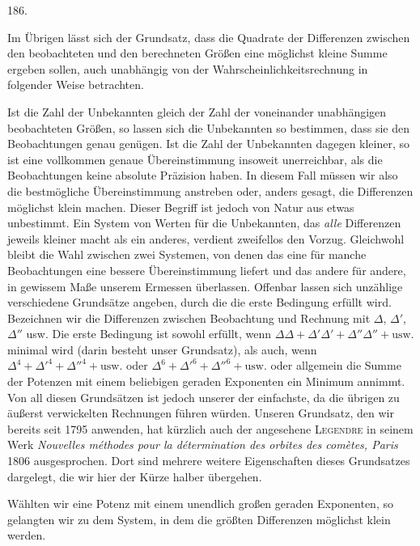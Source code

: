 \begin{center}\hypertarget{native-259-article186}{}186.\end{center}
Im Übrigen lässt sich der Grundsatz, dass die Quadrate der Differenzen zwischen den beobachteten und den berechneten Größen eine möglichst kleine Summe ergeben sollen, auch unabhängig von der Wahrscheinlichkeitsrechnung in folgender Weise betrachten.

Ist die Zahl der Unbekannten gleich der Zahl der voneinander unabhängigen beobachteten Größen, so lassen sich die Unbekannten so bestimmen, dass sie den Beobachtungen genau genügen. Ist die Zahl der Unbekannten dagegen kleiner, so ist eine vollkommen genaue Übereinstimmung insoweit unerreichbar, als die Beobachtungen keine absolute Präzision haben. In diesem Fall müssen wir also die bestmögliche Übereinstimmung anstreben oder, anders gesagt, die Differenzen möglichst klein machen. Dieser Begriff ist jedoch von Natur aus etwas unbestimmt. Ein System von Werten für die Unbekannten, das \emph{alle} Differenzen jeweils kleiner macht als ein anderes, verdient zweifellos den Vorzug. Gleichwohl bleibt die Wahl zwischen zwei Systemen, von denen das eine für manche Beobachtungen eine bessere Übereinstimmung liefert und das andere für andere, in gewissem Maße unserem Ermessen überlassen. Offenbar lassen sich unzählige verschiedene Grundsätze angeben, durch die die erste Bedingung erfüllt wird. Bezeichnen wir die Differenzen zwischen Beobachtung und Rechnung mit $\Delta$, $\Delta'$, $\Delta''$ usw. Die erste Bedingung ist sowohl erfüllt, wenn $\Delta\Delta+\Delta'\Delta'+\Delta''\Delta''+\text{usw.}$ minimal wird (darin besteht unser Grundsatz), als auch, wenn $\Delta^4+\Delta'^4+\Delta''^4+\text{usw.}$ oder $\Delta^6+\Delta'^6+\Delta''^6+\text{usw.}$ oder allgemein die Summe der Potenzen mit einem beliebigen geraden Exponenten ein Minimum annimmt. Von all diesen Grundsätzen ist jedoch unserer der einfachste, da die übrigen zu äußerst verwickelten Rechnungen führen würden. Unseren Grundsatz, den wir bereits seit 1795 anwenden, hat kürzlich auch der angesehene \textsc{Legendre} in seinem Werk \emph{Nouvelles méthodes pour la
détermination des orbites des comètes, Paris} 1806 ausgesprochen. Dort sind mehrere weitere Eigenschaften dieses Grundsatzes dargelegt, die wir hier der Kürze halber übergehen.

Wählten wir eine Potenz mit einem unendlich großen geraden Exponenten, so gelangten wir zu dem System, in dem die größten Differenzen möglichst klein werden.

